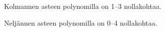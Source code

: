 \begin{esimerkki} Kolmannen asteen polynomilla on 1--3 nollakohtaa.

\begin{lukusuora}{-2.5}{3}{3.6}
\lukusuoraisobbox
{}
\end{lukusuora}
\begin{lukusuora}{-2.8}{2.5}{3.6}
\lukusuoraisobbox
{}
\end{lukusuora}
\begin{lukusuora}{-2}{2}{3.6}
\lukusuoraisobbox
{}
\end{lukusuora}

\end{esimerkki}


\begin{esimerkki} Neljännen asteen polynomilla on 0--4 nollakohtaa.

\begin{lukusuora}{-4}{4}{3.6}
\end{lukusuora}
\begin{lukusuora}{-4}{4}{3.6}
\end{lukusuora}
\begin{lukusuora}{-4}{4}{3.6}
\end{lukusuora}

\begin{lukusuora}{-4}{4}{3.6}
\end{lukusuora}
\begin{lukusuora}{-2.8}{2.8}{3.6}
\end{lukusuora}

\end{esimerkki}

